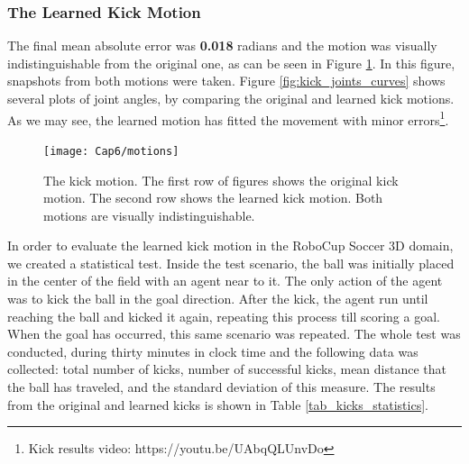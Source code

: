 \subsubsection{The Learned Kick Motion}

The final mean absolute error was \textbf{0.018} radians and the motion was visually indistinguishable from the original one, as can be seen in Figure \ref{fig:motions}. In this figure, snapshots from both motions were taken. Figure \ref{fig:kick_joints_curves} shows several plots of joint angles, by comparing the original and learned kick motions. As we may see, the learned motion has fitted the movement with minor errors\footnote{\label{footnote_walk} Kick results video: https://youtu.be/UAbqQLUnvDo}.

\begin{figure}[!htbp]
	\centering
	\texttt{[image: Cap6/motions]}
	\caption{The kick motion. The first row of figures shows the original kick motion. The second row shows the learned kick motion. Both motions are visually indistinguishable.}
	\label{fig:motions}
\end{figure} 

In order to evaluate the learned kick motion in the RoboCup Soccer 3D domain, we created a statistical test. Inside the test scenario, the ball was initially placed in the center of the field with an agent near to it. The only action of the agent was to kick the ball in the goal direction. After the kick, the agent run until reaching the ball and kicked it again, repeating this process till scoring a goal. When the goal has occurred, this same scenario was repeated. The whole test was conducted, during thirty minutes in clock time and the following data was collected: total number of kicks, number of successful kicks, mean distance that the ball has traveled, and the standard deviation of this measure. The results from the original and learned kicks is shown in Table \ref{tab_kicks_statistics}.


